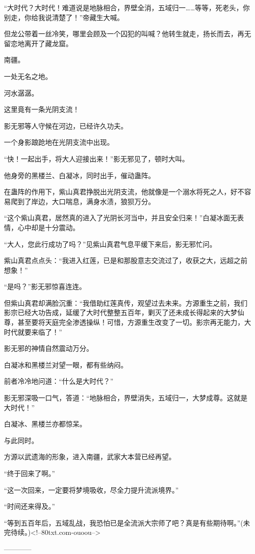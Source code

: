 \begin{this_body}
“大时代？大时代！难道说是地脉相合，界壁全消，五域归一……等等，死老头，你别走，你给我说清楚了！”帝藏生大喊。

但龙公带着一丝冷笑，哪里会顾及一个囚犯的叫喊？他转生就走，扬长而去，再无留恋地离开了藏龙窟。

南疆。

一处无名之地。

河水潺潺。

这里竟有一条光阴支流！

影无邪等人守候在河边，已经许久功夫。

一个身影踉跄地在光阴支流中出现。

“快！一起出手，将大人迎接出来！”影无邪见了，顿时大叫。

他身旁的黑楼兰、白凝冰，同时出手，催动蛊阵。

在蛊阵的作用下，紫山真君挣脱出光阴支流，他就像是一个溺水将死之人，好不容易爬到了岸边，大口喘息，满身水渍，狼狈万分。

“这个紫山真君，居然真的进入了光阴长河当中，并且安全归来！”白凝冰面无表情，心中却是十分震动。

“大人，您此行成功了吗？”见紫山真君气息平缓下来后，影无邪忙问。

紫山真君点点头：“我进入红莲，已是和那股意志交流过了，收获之大，远超之前想象！”

“是吗？”影无邪惊喜连连。

但紫山真君却满脸沉重：“我借助红莲真传，观望过去未来。方源重生之前，我们影宗已经大功告成，延缓了大时代整整五百年，剿灭了还未成长得起来的大梦仙尊，甚至要将天庭完全渗透操纵！可惜，方源重生改变了一切。影宗再无能力，大时代就要来临了！”

影无邪的神情自然震动万分。

白凝冰和黑楼兰对望一眼，都有些纳闷。

前者冷冷地问道：“什么是大时代？”

影无邪深吸一口气，答道：“地脉相合，界壁消失，五域归一，大梦成尊。这就是大时代！”

白凝冰、黑楼兰亦都惊呆。

与此同时。

方源以武遗海的形象，进入南疆，武家大本营已经再望。

“终于回来了啊。”

“这一次回来，一定要将梦境吸收，尽全力提升流派境界。”

“时间还来得及。”

“等到五百年后，五域乱战，我恐怕已是全流派大宗师了吧？真是有些期待啊。”(未完待续。)<!--80txt.com-ouoou-->

------------

\end{this_body}

